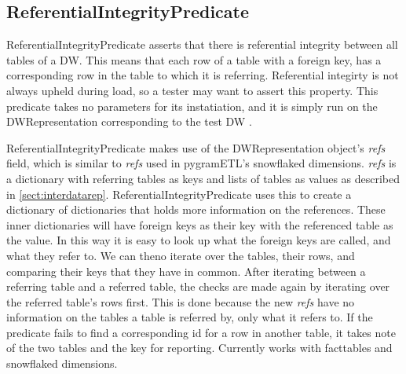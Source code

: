 \subsection{ReferentialIntegrityPredicate}
ReferentialIntegrityPredicate asserts that there is referential integrity between all tables of  a DW. This means that each row of a table with a foreign key, has a corresponding row in the table to which it is referring. Referential integirty is not always upheld during load, so a tester may want to assert this property. This predicate takes no parameters for its instatiation, and it is simply run on the DWRepresentation corresponding to the test DW .

ReferentialIntegrityPredicate makes use of the DWRepresentation object's \emph{refs} field, which is similar to \emph{refs} used in pygramETL's snowflaked dimensions. \emph{refs} is a dictionary with referring tables as keys and lists of tables as values as described in \cref{sect:interdatarep}. ReferentialIntegrityPredicate uses this to create a dictionary of dictionaries that holds more information on the references. These inner dictionaries will have foreign keys as their key with the referenced table as the value. In this way it is easy to look up what the foreign keys are called, and what they refer to. We can theno iterate over the tables, their rows, and comparing their keys that they have in common. After iterating between a referring table and a referred table, the checks are made again by iterating over the referred table's rows first. This is done because the new \emph{refs} have no information on the tables a table is referred by, only what it refers to. If the predicate fails to find a corresponding id for a row in another table, it takes note of the two tables and the key for reporting. Currently works with facttables and snowflaked dimensions.
